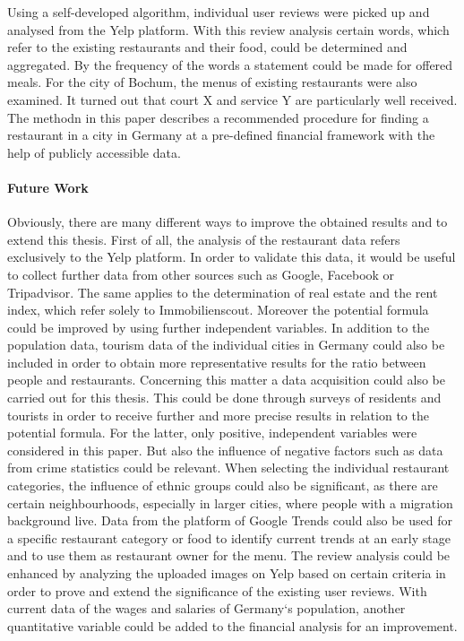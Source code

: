Using a self-developed algorithm, individual user reviews were picked up and analysed from the Yelp platform. With this review analysis certain words, which refer to the existing restaurants and their food, could be determined and aggregated. By the frequency of the words a statement could be made for offered meals. %
\newline
For the city of Bochum, the menus of existing restaurants were also examined. It turned out that court X and service Y are particularly well received. %
The methodn in this paper describes a recommended procedure for finding a restaurant in a city in Germany at a pre-defined financial framework with the help of publicly accessible data.

\paragraph{Future Work}
Obviously, there are many different ways to improve the obtained results and to extend this thesis. First of all, the analysis of the restaurant data refers exclusively to the Yelp platform. In order to validate this data, it would be useful to collect further data from other sources such as Google, Facebook or Tripadvisor. The same applies to the determination of real estate and the rent index, which refer solely to Immobilienscout. \newline
Moreover the potential formula could be improved by using further independent variables. In addition to the population data, tourism data of the individual cities in Germany could also be included in order to obtain more representative results for the ratio between people and restaurants. Concerning this matter a data acquisition could also be carried out for this thesis. This could be done through surveys of residents and tourists in order to receive further and more precise results in relation to the potential formula. For the latter, only positive, independent variables were considered in this paper. But also the influence of negative factors such as data from crime statistics could be relevant. \newline
When selecting the individual restaurant categories, the influence of ethnic groups could also be significant, as there are certain neighbourhoods, especially in larger cities, where people with a migration background live. Data from the platform of Google Trends could also be used for a specific restaurant category or food to identify current trends at an early stage and to use them as restaurant owner for the menu. \newline
The review analysis could be enhanced by analyzing the uploaded images on Yelp based on certain criteria in order to prove and extend the significance of the existing user reviews. With current data of the wages and salaries of Germany‘s population, another quantitative variable could be added to the financial analysis for an improvement. 
